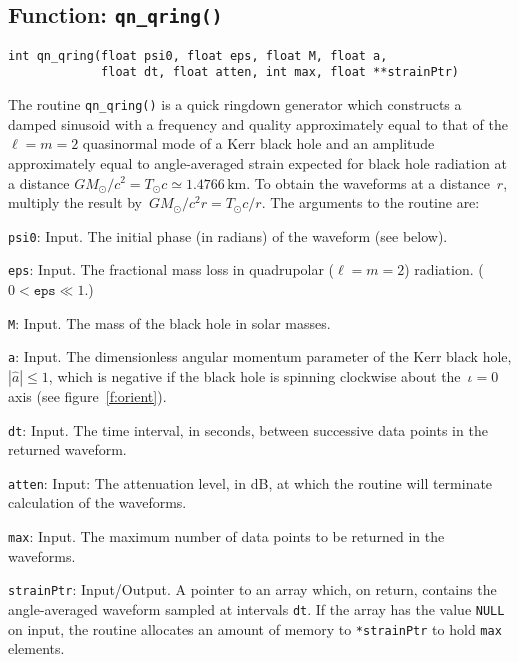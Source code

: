 \clearpage
\subsection{Function: \texttt{qn\_qring()}}

\begin{verbatim}
int qn_qring(float psi0, float eps, float M, float a,
             float dt, float atten, int max, float **strainPtr)
\end{verbatim}
The routine \texttt{qn\_qring()} is a quick ringdown generator which constructs
a damped sinusoid with a frequency and quality approximately equal to that
of the $\ell=m=2$ quasinormal mode of a Kerr black hole and an amplitude
approximately equal to angle-averaged strain expected for black hole radiation
at a distance $GM_\odot/c^2=T_\odot c\simeq1.4766\,{\mathrm{km}}$.  To obtain
the waveforms at a distance~$r$, multiply the result
by~$GM_\odot/c^2r=T_\odot c/r$.  The arguments to the routine are:
\begin{description}
\item{\texttt{psi0}}: Input.  The initial phase (in radians) of the waveform
  (see below).
\item{\texttt{eps}}: Input.  The fractional mass loss in quadrupolar
  ($\ell=m=2$) radiation.  ($0<\texttt{eps}\ll1$.)
\item{\texttt{M}}: Input.  The mass of the black hole in solar masses.
\item{\texttt{a}}: Input.  The dimensionless angular momentum parameter
  of the Kerr black hole, $|\hat{a}|\le1$, which is negative if the black hole
  is spinning clockwise about the~$\iota=0$ axis (see figure~\ref{f:orient}).
\item{\texttt{dt}}: Input. The time interval, in seconds, between successive
  data points in the returned waveform.
\item{\texttt{atten}}: Input:  The attenuation level, in dB, at which the
  routine will terminate calculation of the waveforms.
\item{\texttt{max}}: Input.  The maximum number of data points to be returned
  in the waveforms.
\item{\texttt{strainPtr}}: Input/Output.  A pointer to an array which, on
  return, contains the angle-averaged waveform sampled at intervals
  \texttt{dt}.  If the array has the value \texttt{NULL} on input, the routine
  allocates an amount of memory to \texttt{*strainPtr} to hold \texttt{max}
  elements.
\end{description}

